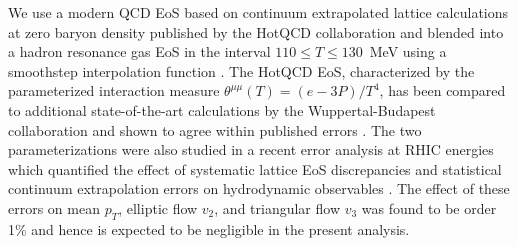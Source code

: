 \documentclass[aps,prc,reprint,amsmath,nofootinbib,superscriptaddress]{revtex4-1}
\begin{document}
We use a modern QCD EoS based on continuum extrapolated lattice calculations at zero baryon density published by the HotQCD collaboration \cite{Bazavov:2014pvz} and blended into a hadron resonance gas EoS in the interval $110 \le T \le 130$~MeV using a smoothstep interpolation function \cite{Moreland:2015dvc}.
The HotQCD EoS, characterized by the parameterized interaction measure $\theta^{\mu\mu}(T) = (e - 3P)/T^4$, has been compared to additional state-of-the-art calculations by the Wuppertal-Budapest collaboration and shown to agree within published errors \cite{Bazavov:2014pvz}.
The two parameterizations were also studied in a recent error analysis at RHIC energies which quantified the effect of systematic lattice EoS discrepancies and statistical continuum extrapolation errors on hydrodynamic observables \cite{Moreland:2015dvc}.
The effect of these errors on mean $p_T$, elliptic flow $v_2$, and triangular flow $v_3$ was found to be order 1\% and hence is expected to be negligible in the present analysis.
\end{document}
